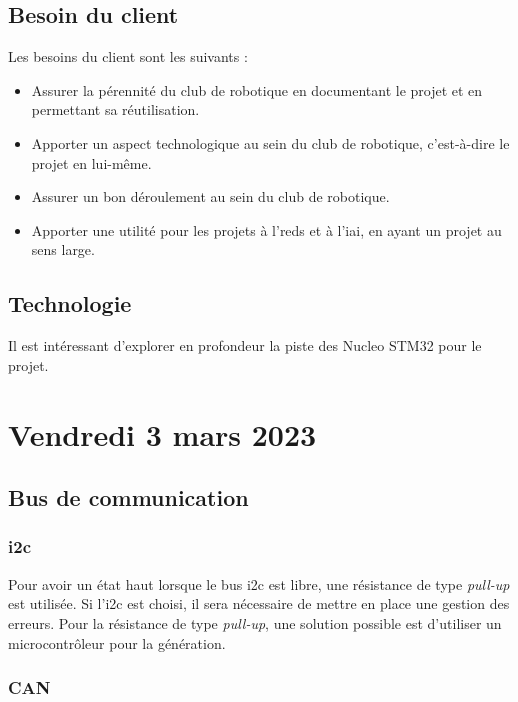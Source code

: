 \subsection{Besoin du client}

Les besoins du client sont les suivants :
\begin{itemize}
    \item Assurer la pérennité du club de robotique en documentant le projet et en permettant sa réutilisation.
    \item Apporter un aspect technologique au sein du club de robotique, c'est-à-dire le projet en lui-même.
    \item Assurer un bon déroulement au sein du club de robotique.
    \item Apporter une utilité pour les projets à l'\gls{reds} et à l'\gls{iai}, en ayant un projet au sens large.
\end{itemize}

\subsection{Technologie}

Il est intéressant d'explorer en profondeur la piste des Nucleo STM32 pour le projet.

\section{Vendredi 3 mars 2023}

\subsection{Bus de communication}

\subsubsection{\gls{i2c}}

Pour avoir un état haut lorsque le bus \gls{i2c} est libre, une résistance de type \textit{pull-up} est utilisée.
Si l'\gls{i2c} est choisi, il sera nécessaire de mettre en place une gestion des erreurs.
Pour la résistance de type \textit{pull-up}, une solution possible est d'utiliser un microcontrôleur pour la génération.

\subsubsection{CAN}

